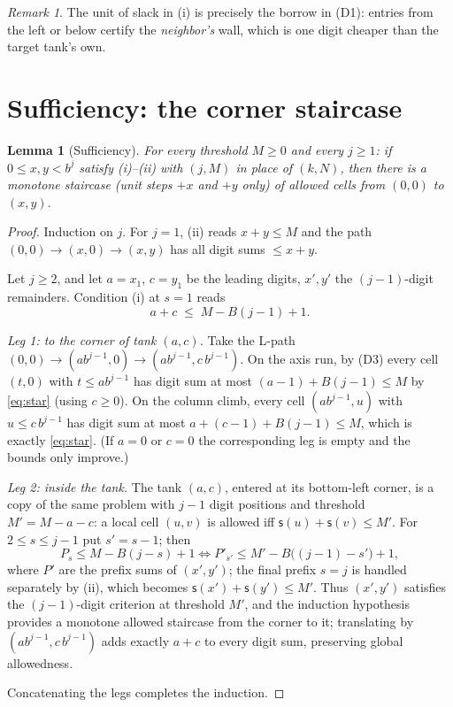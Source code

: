 \documentclass[11pt]{article}
\newtheorem{lemma}[theorem]{Lemma}
\theoremstyle{remark}
\newtheorem{remark}[theorem]{Remark}
\newcommand{\ds}{\mathsf{s}}
\begin{document}
\begin{remark}
The unit of slack in (i) is precisely the borrow in (D1): entries from the left or
below certify the \emph{neighbor's} wall, which is one digit cheaper than the
target tank's own.
\end{remark}

\section{Sufficiency: the corner staircase}

\begin{lemma}[Sufficiency]\label{lem:suf}
For every threshold $M\ge 0$ and every $j\ge 1$: if $0\le x,y<b^j$ satisfy
\textup{(i)}--\textup{(ii)} with $(j,M)$ in place of $(k,N)$, then there is a
monotone staircase (unit steps $+x$ and $+y$ only) of allowed cells from $(0,0)$
to $(x,y)$.
\end{lemma}

\begin{proof}
Induction on $j$. For $j=1$, (ii) reads $x+y\le M$ and the path
$(0,0)\to(x,0)\to(x,y)$ has all digit sums $\le x+y$.

Let $j\ge2$, and let $a=x_1$, $c=y_1$ be the leading digits, $x',y'$ the
$(j{-}1)$-digit remainders. Condition (i) at $s=1$ reads
\begin{equation}\label{eq:star}
a+c\;\le\;M-B(j-1)+1 . \tag{$\star$}
\end{equation}

\emph{Leg 1: to the corner of tank $(a,c)$.} Take the L-path
$(0,0)\to(a b^{j-1},0)\to(a b^{j-1},c\, b^{j-1})$. On the axis run, by (D3) every
cell $(t,0)$ with $t\le ab^{j-1}$ has digit sum at most $(a-1)+B(j-1)\le M$ by
\eqref{eq:star} (using $c\ge0$). On the column climb, every cell
$(a b^{j-1},u)$ with $u\le c\,b^{j-1}$ has digit sum at most
$a+(c-1)+B(j-1)\le M$, which is exactly \eqref{eq:star}. (If $a=0$ or $c=0$ the
corresponding leg is empty and the bounds only improve.)

\emph{Leg 2: inside the tank.} The tank $(a,c)$, entered at its bottom-left corner,
is a copy of the same problem with $j-1$ digit positions and threshold
$M'=M-a-c$: a local cell $(u,v)$ is allowed iff $\ds(u)+\ds(v)\le M'$. For
$2\le s\le j-1$ put $s'=s-1$; then
\[
P_s\le M-B(j-s)+1
\iff
P'_{s'}\le M'-B\bigl((j{-}1)-s'\bigr)+1,
\]
where $P'$ are the prefix sums of $(x',y')$; the final prefix $s=j$ is handled
separately by (ii), which becomes $\ds(x')+\ds(y')\le M'$. Thus $(x',y')$ satisfies the $(j{-}1)$-digit criterion at
threshold $M'$, and the induction hypothesis provides a monotone allowed staircase
from the corner to it; translating by $(a b^{j-1},c\,b^{j-1})$ adds exactly $a+c$
to every digit sum, preserving global allowedness.

Concatenating the legs completes the induction.
\end{proof}
\end{document}
